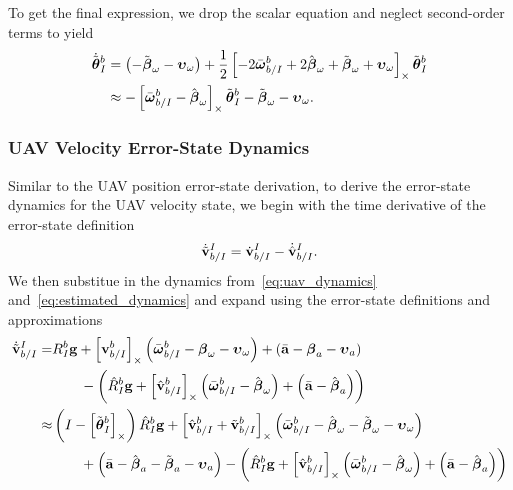 To get the final expression, we drop the scalar equation and neglect
second-order terms to yield
\begin{align}
  \dot{\tilde{\boldsymbol{\mathrm{\theta}}}}_I^b
  &=
    \left( - \tilde{\boldsymbol{\mathrm{\beta}}}_\omega -
    \boldsymbol{\mathrm{\upsilon}}_\omega \right) 
    + \frac{1}{2}
    \left[  -2\bar{\boldsymbol{\mathrm{\omega}}}_{b/I}^b + 2\hat{\boldsymbol{\mathrm{\beta}}}_\omega
      + \tilde{\boldsymbol{\mathrm{\beta}}}_\omega + \boldsymbol{\mathrm{\upsilon}}_\omega  \right]_{\times}
    \tilde{\boldsymbol{\mathrm{\theta}}}_I^b \\
  &\approx
  -\left[  \bar{\boldsymbol{\mathrm{\omega}}}_{b/I}^b - \hat{\boldsymbol{\mathrm{\beta}}}_\omega \right]_{\times}
    \tilde{\boldsymbol{\mathrm{\theta}}}_I^b
    - \tilde{\boldsymbol{\mathrm{\beta}}}_\omega -
    \boldsymbol{\mathrm{\upsilon}}_\omega .
\end{align}

\subsubsection{UAV Velocity Error-State Dynamics}
Similar to the UAV position error-state derivation, to derive the error-state
dynamics for the UAV velocity state, we begin with the time derivative of the
error-state definition
\begin{equation}
  \dot{\tilde{\boldsymbol{\mathrm{v}}}}_{b/I}^I = \dot{\boldsymbol{\mathrm{v}}}_{b/I}^I -
  \dot{\hat{\boldsymbol{\mathrm{v}}}}_{b/I}^I.
\end{equation}
We then substitue in the dynamics from~\eqref{eq:uav_dynamics}
and~\eqref{eq:estimated_dynamics} and expand using the error-state definitions
and approximations
\begin{align}
  \dot{\tilde{\boldsymbol{\mathrm{v}}}}_{b/I}^I
  =&
  R_I^b \boldsymbol{\mathrm{g}}
  +
  \left[ \boldsymbol{\mathrm{v}}_{b/I}^b \right]_{\times}
  \left( \bar{\boldsymbol{\mathrm{\omega}}}_{b/I}^b - \boldsymbol{\mathrm{\beta}}_\omega -
  \boldsymbol{\mathrm{\upsilon}}_\omega \right)
  +
  \left( \bar{\boldsymbol{\mathrm{a}}} - \boldsymbol{\mathrm{\beta}}_a - \boldsymbol{\mathrm{\upsilon}}_a \right) \\
                                  & \qquad -
                                  \left( \hat{R}_I^b \boldsymbol{\mathrm{g}}
  +
  \left[ \hat{\boldsymbol{\mathrm{v}}}_{b/I}^b \right]_{\times}
  \left( \bar{\boldsymbol{\mathrm{\omega}}}_{b/I}^b - \hat{\boldsymbol{\mathrm{\beta}}}_\omega \right)
  +
\left( \bar{\boldsymbol{\mathrm{a}}} - \hat{\boldsymbol{\mathrm{\beta}}}_a \right) \right) \nonumber \\
  \approx&
  \left( I - \left[ \tilde{\boldsymbol{\mathrm{\theta}}}_I^b  \right]_{\times}\right) \hat{R}_I^b \boldsymbol{\mathrm{g}}
  +
  \left[  \hat{\boldsymbol{\mathrm{v}}}_{b/I}^b + \tilde{\boldsymbol{\mathrm{v}}}_{b/I}^b  \right]_{\times} 
  \left( \bar{\boldsymbol{\mathrm{\omega}}}_{b/I}^b - \hat{\boldsymbol{\mathrm{\beta}}}_\omega -
    \tilde{\boldsymbol{\mathrm{\beta}}}_\omega -
  \boldsymbol{\mathrm{\upsilon}}_\omega \right) \\
                                  & \qquad 
  + \left( \bar{\boldsymbol{\mathrm{a}}} - \hat{\boldsymbol{\mathrm{\beta}}}_a - \tilde{\boldsymbol{\mathrm{\beta}}}_a - \boldsymbol{\mathrm{\upsilon}}_a \right)
  - \left( \hat{R}_I^b \boldsymbol{\mathrm{g}}
  +
  \left[ \hat{\boldsymbol{\mathrm{v}}}_{b/I}^b \right]_{\times}
  \left( \bar{\boldsymbol{\mathrm{\omega}}}_{b/I}^b - \hat{\boldsymbol{\mathrm{\beta}}}_\omega \right)
  +
\left( \bar{\boldsymbol{\mathrm{a}}} - \hat{\boldsymbol{\mathrm{\beta}}}_a \right) \right) \nonumber
\end{align}
